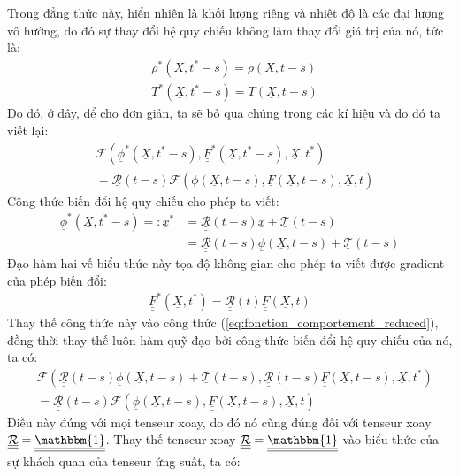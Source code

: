 \documentclass[../../../main.tex]{subfiles}
\begin{document}
	Trong đẳng thức này, hiển nhiên là khối lượng riêng và nhiệt độ là các đại lượng vô hướng, do đó sự thay đổi hệ quy chiếu không làm thay đổi giá trị của nó, tức là:
		\[
			\begin{aligned}
				&\rho^*\left(\underline{X},t^*-s\right)=\rho\left(\underline{X},t-s\right)\\
				&T^*\left(\underline{X},t^*-s\right)=T\left(\underline{X},t-s\right)
			\end{aligned}
		\]
	Do đó, ở đây, để cho đơn giản, ta sẽ bỏ qua chúng trong các kí hiệu và do đó ta viết lại:
		\begin{equation}\label{eq:fonction_comportement_reduced}
			\begin{aligned}
				&\mathcal{F}\left(\underline{\phi}^*\left(\underline{X},t^*-s\right),\underline{\underline{F}}^*\left(\underline{X},t^*-s\right),\underline{X},t^*\right)\\
				&=\underline{\underline{\mathcal{R}}}\left(t-s\right)\mathcal{F}\left(\underline{\phi}\left(\underline{X},t-s\right),\underline{\underline{F}}\left(\underline{X},t-s\right),\underline{X},t\right)
			\end{aligned}
		\end{equation}
	Công thức biến đổi hệ quy chiếu cho phép ta viết:
		\[
			\begin{aligned}
				\underline{\phi}^*\left(\underline{X},t^*-s\right)=:\underline{x}^*&=\underline{\underline{\mathcal{R}}}\left(t-s\right)\underline{x}+\underline{\mathcal{T}}\left(t-s\right)\\
				&=\underline{\underline{\mathcal{R}}}\left(t-s\right)\underline{\phi}\left(\underline{X},t-s\right)+\underline{\mathcal{T}}\left(t-s\right)
			\end{aligned}
		\]
	Đạo hàm hai vế biểu thức này tọa độ không gian cho phép ta viết được gradient của phép biến đổi: 
		\begin{align}
			\underline{\underline{F}}^*\left(\underline{X},t^*\right)=\underline{\underline{\mathcal{R}}}\left(t\right)\underline{\underline{F}}\left(\underline{X},t\right)
		\end{align}
	Thay thế công thức này vào công thức (\ref{eq:fonction_comportement_reduced}), đồng thời thay thế luôn hàm quỹ đạo bởi công thức biến đổi hệ quy chiếu của nó, ta có:
		\[
			\begin{aligned}
				&\mathcal{F}\left(\underline{\underline{\mathcal{R}}}\left(t-s\right)\underline{\phi}\left(\underline{X},t-s\right)+\underline{\mathcal{T}}\left(t-s\right),\underline{\underline{\mathcal{R}}}\left(t-s\right)\underline{\underline{F}}\left(\underline{X},t-s\right),\underline{X},t^*\right)\\
				&=\underline{\underline{\mathcal{R}}}\left(t-s\right)\mathcal{F}\left(\underline{\phi}\left(\underline{X},t-s\right),\underline{\underline{F}}\left(\underline{X},t-s\right),\underline{X},t\right)
			\end{aligned}
		\]
	Điều này đúng với mọi tenseur xoay, do đó nó cũng đúng đối với tenseur xoay $\underline{\underline{\mathcal{R}}}=\underline{\underline{\mathbbm{1}}}$. Thay thế  tenseur xoay $\underline{\underline{\mathcal{R}}}=\underline{\underline{\mathbbm{1}}}$ vào biểu thức của sự khách quan của tenseur ứng suất, ta có:
\end{document}
